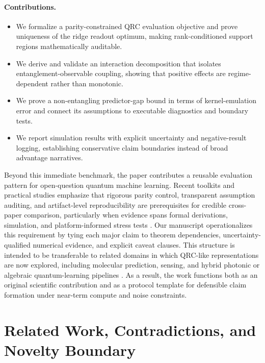 \documentclass{article} %
\begin{document}
\paragraph{Contributions.}
\begin{itemize}
\item We formalize a parity-constrained QRC evaluation objective and prove uniqueness of the ridge readout optimum, making rank-conditioned support regions mathematically auditable.
\item We derive and validate an interaction decomposition that isolates entanglement-observable coupling, showing that positive effects are regime-dependent rather than monotonic.
\item We prove a non-entangling predictor-gap bound in terms of kernel-emulation error and connect its assumptions to executable diagnostics and boundary tests.
\item We report simulation results with explicit uncertainty and negative-result logging, establishing conservative claim boundaries instead of broad advantage narratives.
\end{itemize}

Beyond this immediate benchmark, the paper contributes a reusable evaluation pattern for open-question quantum machine learning. Recent toolkits and practical studies emphasize that rigorous parity control, transparent assumption auditing, and artifact-level reproducibility are prerequisites for credible cross-paper comparison, particularly when evidence spans formal derivations, simulation, and platform-informed stress tests \citep{S017,S023,S024,S032,S036}. Our manuscript operationalizes this requirement by tying each major claim to theorem dependencies, uncertainty-qualified numerical evidence, and explicit caveat clauses. This structure is intended to be transferable to related domains in which QRC-like representations are now explored, including molecular prediction, sensing, and hybrid photonic or algebraic quantum-learning pipelines \citep{S005,S008,S011,S013,S016,S021,S027,S031,S039}. As a result, the work functions both as an original scientific contribution and as a protocol template for defensible claim formation under near-term compute and noise constraints.

\section{Related Work, Contradictions, and Novelty Boundary}\label{sec:related}
\end{document}
